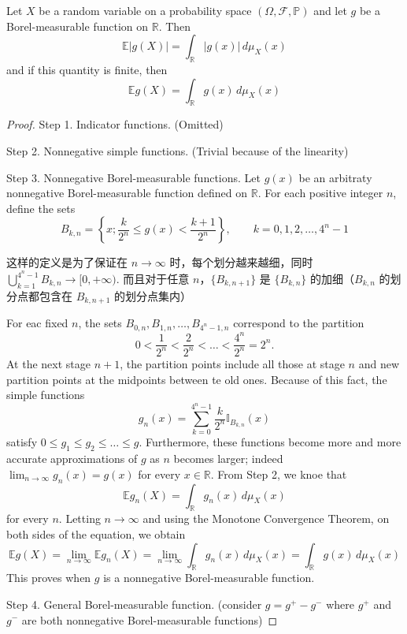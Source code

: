 \begin{theorem}
Let $X$ be a random variable on a probability space $(\Omega,\mathcal{F},\mathbb{P})$ and let $g$ be a Borel-measurable function on $\mathbb{R}$. Then
\[
\mathbb{E}\lvert g(X) \rvert =\int_{\mathbb{R}}^{} \lvert g(x) \rvert  \, d\mu_{X}(x) 
\]
and if this quantity is finite, then
\[
\mathbb{E}g(X)=\int_{\mathbb{R}}^{} g(x) \, d\mu_{X}(x) 
\]
\end{theorem}
\begin{proof}
Step 1. Indicator functions. (Omitted)

Step 2. Nonnegative simple functions. (Trivial because of the linearity)

Step 3. Nonnegative Borel-measurable functions. Let $g(x)$ be an arbitraty nonnegative Borel-measurable function defined on $\mathbb{R}$. For each positive integer $n$, define the sets
\[
B_{k,n}=\left\{  x;\frac{k}{2^{n}} \leq g(x)<\frac{k+1}{2^{n}}  \right\},\qquad k=0,1,2,\dots,4^{n}-1
\]
\begin{remark}
这样的定义是为了保证在 $n\to \infty$ 时，每个划分越来越细，同时 $\bigcup_{k=1}^{4^{n}-1}B_{k,n}\to[0,+\infty)$. 而且对于任意 $n$，$\{ B_{k,n+1} \}$ 是 $\{ B_{k,n} \}$ 的加细（$B_{k,n}$ 的划分点都包含在 $B_{k,n+1}$ 的划分点集内）
\end{remark}
For eac fixed $n$, the sets $B_{0,n},B_{1,n},\dots,B_{4^{n}-1,n}$ correspond to the partition
\[
0<\frac{1}{2^{n}}<\frac{2}{2^{n}}<\dots<\frac{4^{n}}{2^{n}}=2^{n}.
\]
At the next stage $n+1$, the partition points include all those at stage $n$ and new partition points at the midpoints between te old ones. Because of this fact, the simple functions
\[
g_n(x)=\sum_{k=0}^{4^{n}-1} \frac{k}{2^{n}}\mathbb{I}_{B_{k,n}}(x)
\]
satisfy $0\leq g_1\leq g_2\leq\dots\leq g$. Furthermore, these functions become more and more accurate approximations of $g$ as $n$ becomes larger; indeed $\lim_{ n \to \infty }g_n(x)=g(x)$ for every $x\in \mathbb{R}$. From Step 2, we knoe that
\[
\mathbb{E}g_n(X)=\int_{\mathbb{R}}^{} g_n(x) \, d\mu_{X}(x)
\]
for every $n$. Letting $n\to \infty$ and using the Monotone Convergence Theorem, on both sides of the equation, we obtain
\[
\mathbb{E}g(X)=\lim_{ n \to \infty } \mathbb{E}g_n(X)=\lim_{ n \to \infty } \int_{\mathbb{R}}^{} g_n(x) \, d\mu_{X}(x)=\int_{\mathbb{R}}^{} g(x) \, d\mu_{X}(x)
\]
This proves when $g$ is a nonnegative Borel-measurable function.

Step 4. General Borel-measurable function. (consider $g=g^{+}-g^{-}$ where $g^{+}$ and $g^{-}$ are both nonnegative Borel-measurable functions)

\end{proof}

